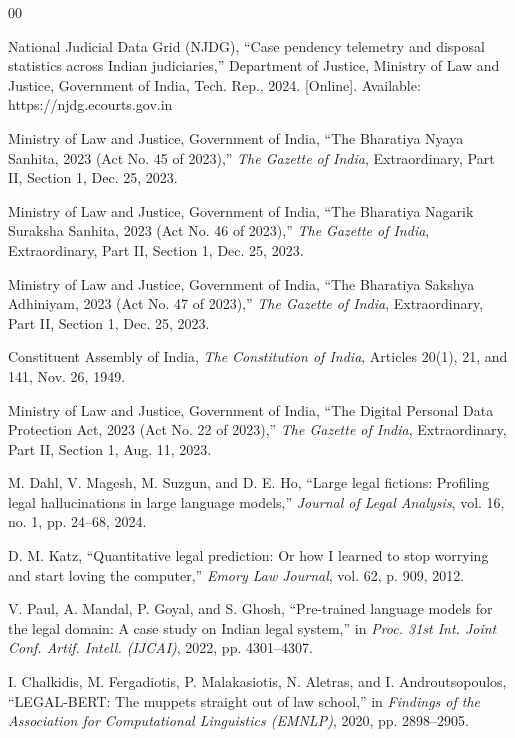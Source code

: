 \documentclass[conference]{IEEEtran}
\begin{document}
\begin{thebibliography}{00}

National Judicial Data Grid (NJDG), ``Case pendency telemetry and disposal statistics across Indian judiciaries,'' Department of Justice, Ministry of Law and Justice, Government of India, Tech. Rep., 2024. [Online]. Available: https://njdg.ecourts.gov.in

Ministry of Law and Justice, Government of India, ``The Bharatiya Nyaya Sanhita, 2023 (Act No. 45 of 2023),'' \textit{The Gazette of India}, Extraordinary, Part II, Section 1, Dec. 25, 2023.

Ministry of Law and Justice, Government of India, ``The Bharatiya Nagarik Suraksha Sanhita, 2023 (Act No. 46 of 2023),'' \textit{The Gazette of India}, Extraordinary, Part II, Section 1, Dec. 25, 2023.

Ministry of Law and Justice, Government of India, ``The Bharatiya Sakshya Adhiniyam, 2023 (Act No. 47 of 2023),'' \textit{The Gazette of India}, Extraordinary, Part II, Section 1, Dec. 25, 2023.

Constituent Assembly of India, \textit{The Constitution of India}, Articles 20(1), 21, and 141, Nov. 26, 1949.

Ministry of Law and Justice, Government of India, ``The Digital Personal Data Protection Act, 2023 (Act No. 22 of 2023),'' \textit{The Gazette of India}, Extraordinary, Part II, Section 1, Aug. 11, 2023.

M. Dahl, V. Magesh, M. Suzgun, and D. E. Ho, ``Large legal fictions: Profiling legal hallucinations in large language models,'' \textit{Journal of Legal Analysis}, vol. 16, no. 1, pp. 24--68, 2024.

D. M. Katz, ``Quantitative legal prediction: Or how I learned to stop worrying and start loving the computer,'' \textit{Emory Law Journal}, vol. 62, p. 909, 2012.

V. Paul, A. Mandal, P. Goyal, and S. Ghosh, ``Pre-trained language models for the legal domain: A case study on Indian legal system,'' in \textit{Proc. 31st Int. Joint Conf. Artif. Intell. (IJCAI)}, 2022, pp. 4301--4307.

I. Chalkidis, M. Fergadiotis, P. Malakasiotis, N. Aletras, and I. Androutsopoulos, ``LEGAL-BERT: The muppets straight out of law school,'' in \textit{Findings of the Association for Computational Linguistics (EMNLP)}, 2020, pp. 2898--2905.


\end{thebibliography}
\end{document}
